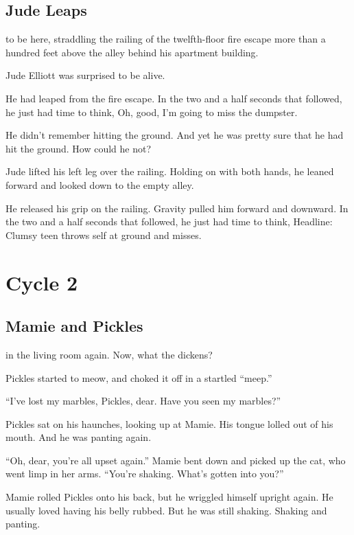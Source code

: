 \chapter{Jude Leaps}

 to be here, straddling the railing of the twelfth-floor fire escape more than a hundred feet above the alley behind his apartment building.

Jude Elliott was surprised to be alive.

He had leaped from the fire escape. In the two and a half seconds that followed, he just had time to think, Oh, good, I'm going to miss the dumpster.

He didn't remember hitting the ground. And yet he was pretty sure that he had hit the ground. How could he not?

Jude lifted his left leg over the railing. Holding on with both hands, he leaned forward and looked down to the empty alley.

He released his grip on the railing. Gravity pulled him forward and downward. In the two and a half seconds that followed, he just had time to think, Headline: Clumsy teen throws self at ground and misses.

\part{Cycle 2}

\chapter{Mamie and Pickles}

 in the living room again. Now, what the dickens?

Pickles started to meow, and choked it off in a startled ``meep.''

``I've lost my marbles, Pickles, dear. Have you seen my marbles?''

Pickles sat on his haunches, looking up at Mamie. His tongue lolled out of his mouth. And he was panting again.

``Oh, dear, you're all upset again.'' Mamie bent down and picked up the cat, who went limp in her arms. ``You're shaking. What's gotten into you?''

Mamie rolled Pickles onto his back, but he wriggled himself upright again. He usually loved having his belly rubbed. But he was still shaking. Shaking and panting.

